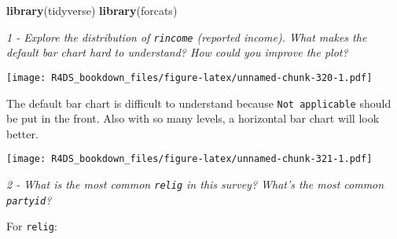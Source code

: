 \documentclass[]{article}
\newenvironment{Shaded}{\begin{snugshade}}{\end{snugshade}}
\newcommand{\KeywordTok}[1]{\textcolor[rgb]{0.13,0.29,0.53}{\textbf{#1}}}
\newcommand{\DataTypeTok}[1]{\textcolor[rgb]{0.13,0.29,0.53}{#1}}
\newcommand{\DecValTok}[1]{\textcolor[rgb]{0.00,0.00,0.81}{#1}}
\newcommand{\StringTok}[1]{\textcolor[rgb]{0.31,0.60,0.02}{#1}}
\newcommand{\OperatorTok}[1]{\textcolor[rgb]{0.81,0.36,0.00}{\textbf{#1}}}
\newcommand{\NormalTok}[1]{#1}
\theoremstyle{definition}
\theoremstyle{definition}
\theoremstyle{definition}
\theoremstyle{remark}
\begin{document}
\begin{Shaded}
\begin{Highlighting}[]
\KeywordTok{library}\NormalTok{(tidyverse)}
\KeywordTok{library}\NormalTok{(forcats)}
\end{Highlighting}
\end{Shaded}

\emph{1 - Explore the distribution of \texttt{rincome} (reported
income). What makes the default bar chart hard to understand? How could
you improve the plot?}

\begin{Shaded}
\end{Shaded}

\texttt{[image: R4DS\_bookdown\_files/figure-latex/unnamed-chunk-320-1.pdf]}

The default bar chart is difficult to understand because
\texttt{Not\ applicable} should be put in the front. Also with so many
levels, a horizontal bar chart will look better.

\begin{Shaded}
\end{Shaded}

\texttt{[image: R4DS\_bookdown\_files/figure-latex/unnamed-chunk-321-1.pdf]}

\emph{2 - What is the most common \texttt{relig} in this survey? What's
the most common \texttt{partyid}?}

For \texttt{relig}:
\end{document}
